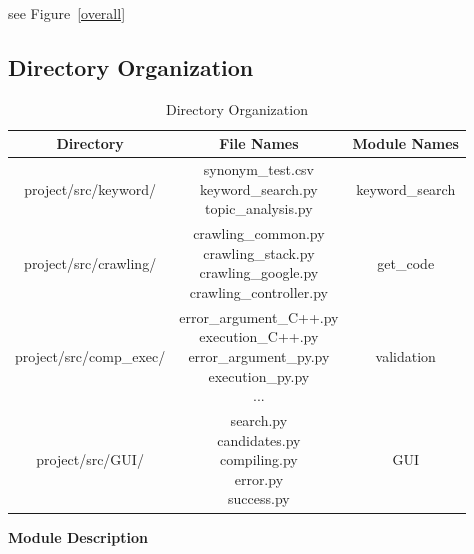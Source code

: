 \documentclass[conference]{IEEEtran}
\begin{document}
see Figure~\ref{overall}


\subsection{Directory Organization} %
\label{sub:directory_organization}

\begin{table}[ht]
\renewcommand{\arraystretch}{1.3}
\caption{Directory Organization}
\label{table:directory_org}
\centering
\begin{adjustbox}{width=0.5\textwidth}
\small
\begin{tabular}{c||c||c}
\hline
\bfseries Directory & \bfseries File Names & \bfseries Module Names \\
\hline\hline
project/src/keyword/  & \parbox[t]{5cm}{synonym\_test.csv \\ keyword\_search.py \\ topic\_analysis.py} & \parbox[t]{5cm}{keyword\_search}\\
\hline
project/src/crawling/ & \parbox[t]{5cm}{crawling\_common.py \\ crawling\_stack.py \\ crawling\_google.py \\ crawling\_controller.py} & \parbox[t]{5cm}{get\_code}\\
\hline
project/src/comp\_exec/ &\parbox[t]{5cm}{error\_argument\_C++.py \\ execution\_C++.py \\ error\_argument\_py.py \\ execution\_py.py \\ ... } & \parbox[t]{5cm}{validation}\\
\hline
project/src/GUI/ & \parbox[t]{5cm}{search.py \\candidates.py \\ compiling.py \\ error.py \\ success.py} & \parbox[t]{5cm}{GUI}\\
\hline

\end{tabular}
\end{adjustbox}
\end{table}

\textbf{Module Description}
\end{document}
